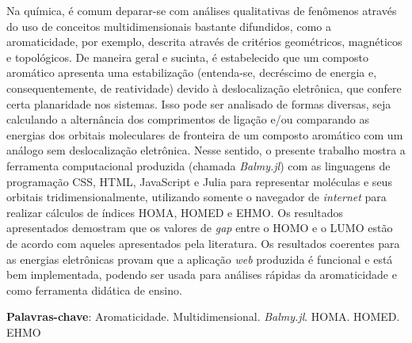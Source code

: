 
\setlength{\absparsep}{18pt} %
\begin{resumo}
	\SingleSpacing
    Na química, é comum deparar-se com análises qualitativas de fenômenos através do uso de conceitos multidimensionais bastante difundidos, como a aromaticidade, por exemplo, descrita através de critérios geométricos, magnéticos e topológicos. De maneira geral e sucinta, é estabelecido que um composto aromático apresenta uma estabilização (entenda-se, decréscimo de energia e, consequentemente, de reatividade) devido à deslocalização eletrônica, que confere certa planaridade nos sistemas. Isso pode ser analisado de formas diversas, seja calculando a alternância dos comprimentos de ligação e/ou comparando as energias dos orbitais moleculares de fronteira de um composto aromático com um análogo sem deslocalização eletrônica. Nesse sentido, o presente trabalho mostra a ferramenta computacional produzida (chamada \textit{Balmy.jl}) com as linguagens de programação \gls{CSS}, \gls{HTML}, JavaScript e Julia para representar moléculas e seus orbitais tridimensionalmente, utilizando somente o navegador de \textit{internet} para realizar cálculos de índices \gls{HOMA}, \gls{HOMED} e \gls{EHMO}. Os resultados apresentados demostram que os valores de \textit{gap} entre o \gls{HOMO} e o \gls{LUMO} estão de acordo com aqueles apresentados pela literatura. Os resultados coerentes para as energias eletrônicas provam que a aplicação \textit{web} produzida é funcional e está bem implementada, podendo ser usada para análises rápidas da aromaticidade e como ferramenta didática de ensino.
	
	\textbf{Palavras-chave}: Aromaticidade. Multidimensional. \textit{Balmy.jl}. \gls{HOMA}. \gls{HOMED}. \gls{EHMO}
\end{resumo}

